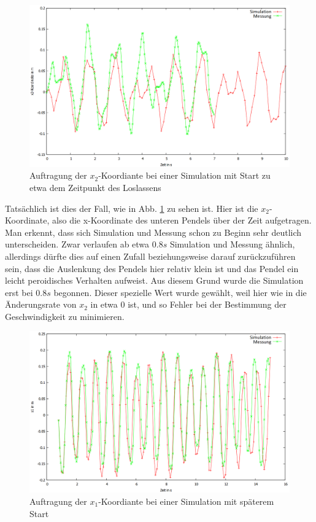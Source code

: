 \begin{figure}
        \includegraphics[width=.9\textwidth]{images/x2_ueber_t_beginn_neu.png}
\caption{Auftragung der $x_2$-Koordiante bei einer Simulation mit Start zu etwa dem Zeitpunkt des Loslassens}
\label{x2_ueber_t_alt}
\end{figure}


Tatsächlich ist dies der Fall, wie in Abb. \ref{x2_ueber_t_alt} zu sehen ist. Hier ist die $x_2$-Koordinate, also die x-Koordinate des unteren Pendels über der Zeit aufgetragen. Man erkennt, dass sich Simulation und Messung schon zu Beginn sehr deutlich unterscheiden. Zwar verlaufen ab etwa $ 0.8 s $ Simulation und Messung ähnlich, allerdings dürfte dies auf einen Zufall beziehungsweise darauf zurückzuführen sein, dass die Auslenkung des Pendels hier relativ klein ist und das Pendel ein leicht peroidisches Verhalten aufweist. 
Aus diesem Grund wurde die Simulation erst bei $ 0.8 s $ begonnen. Dieser spezielle Wert wurde gewählt, weil hier wie in  die Änderungsrate von $x_2$ in etwa 0 ist, und so Fehler bei der Bestimmung der Geschwindigkeit zu minimieren. 

\begin{figure}
        \includegraphics[width=.9\textwidth]{images/x1_ueber_t_neu.png}
\caption{Auftragung der $x_1$-Koordiante bei einer Simulation mit späterem Start}
\label{x1_ueber_t}
\end{figure}


